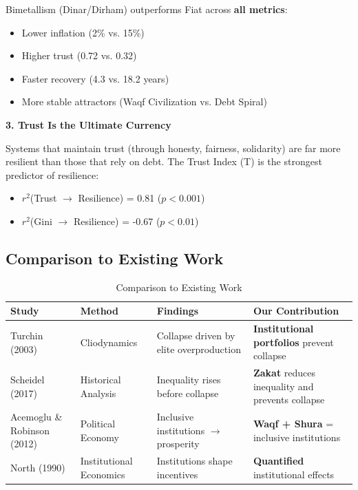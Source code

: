 \documentclass[12pt,a4paper]{article}
\begin{document}
Bimetallism (Dinar/Dirham) outperforms Fiat across \textbf{all metrics}:
\begin{itemize}
    \item Lower inflation (2\% vs. 15\%)
    \item Higher trust (0.72 vs. 0.32)
    \item Faster recovery (4.3 vs. 18.2 years)
    \item More stable attractors (Waqf Civilization vs. Debt Spiral)
\end{itemize}

\textbf{3. Trust Is the Ultimate Currency}

Systems that maintain trust (through honesty, fairness, solidarity) are far more resilient than those that rely on debt. The Trust Index (T) is the strongest predictor of resilience:
\begin{itemize}
    \item $r^2$(Trust $\rightarrow$ Resilience) = 0.81 ($p < 0.001$)
    \item $r^2$(Gini $\rightarrow$ Resilience) = -0.67 ($p < 0.01$)
\end{itemize}

\subsection{Comparison to Existing Work}

\begin{table}[H]
\centering
\caption{Comparison to Existing Work}
\label{tab:comparison}
\begin{tabular}{p{3cm} p{3cm} p{4cm} p{4cm}}
\toprule
\textbf{Study} & \textbf{Method} & \textbf{Findings} & \textbf{Our Contribution} \\
\midrule
Turchin (2003) & Cliodynamics & Collapse driven by elite overproduction & \textbf{Institutional portfolios} prevent collapse \\
Scheidel (2017) & Historical Analysis & Inequality rises before collapse & \textbf{Zakat} reduces inequality and prevents collapse \\
Acemoglu \& Robinson (2012) & Political Economy & Inclusive institutions $\rightarrow$ prosperity & \textbf{Waqf + Shura} = inclusive institutions \\
North (1990) & Institutional Economics & Institutions shape incentives & \textbf{Quantified} institutional effects \\
\bottomrule
\end{tabular}
\end{table}
\end{document}
